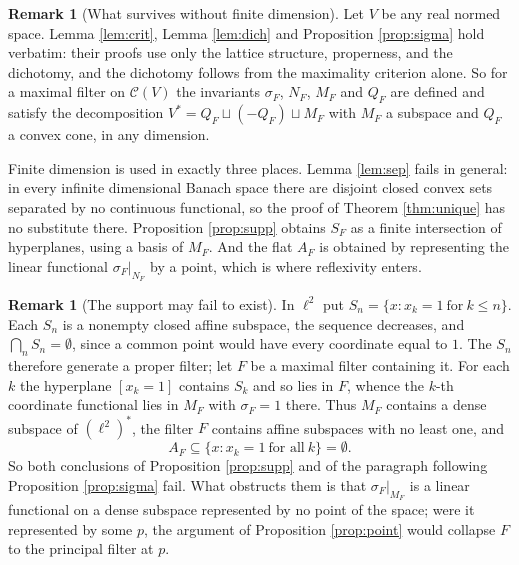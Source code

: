 \documentclass[11pt]{amsart}
\theoremstyle{plain}
\theoremstyle{definition}
\newtheorem{remark}[theorem]{Remark}
\newcommand{\CC}{\mathscr{C}}
\newcommand{\Vs}{V^{*}}
\begin{document}
\begin{remark}[What survives without finite dimension]\label{rem:generality}
Let $V$ be any real normed space. Lemma \ref{lem:crit}, Lemma \ref{lem:dich} and Proposition \ref{prop:sigma} hold verbatim: their proofs use only the lattice structure, properness, and the dichotomy, and the dichotomy follows from the maximality criterion alone. So for a maximal filter on $\CC(V)$ the invariants $\sigma_F$, $N_F$, $M_F$ and $Q_F$ are defined and satisfy the decomposition $\Vs=Q_F\sqcup(-Q_F)\sqcup M_F$ with $M_F$ a subspace and $Q_F$ a convex cone, in any dimension.

Finite dimension is used in exactly three places. Lemma \ref{lem:sep} fails in general: in every infinite dimensional Banach space there are disjoint closed convex sets separated by no continuous functional, so the proof of Theorem \ref{thm:unique} has no substitute there. Proposition \ref{prop:supp} obtains $S_F$ as a finite intersection of hyperplanes, using a basis of $M_F$. And the flat $A_F$ is obtained by representing the linear functional $\sigma_F|_{N_F}$ by a point, which is where reflexivity enters.
\end{remark}

\begin{remark}[The support may fail to exist]\label{rem:nosupport}
In $\ell^2$ put $S_n=\{x:x_k=1\ \text{for}\ k\le n\}$. Each $S_n$ is a nonempty closed affine subspace, the sequence decreases, and $\bigcap_nS_n=\emptyset$, since a common point would have every coordinate equal to $1$. The $S_n$ therefore generate a proper filter; let $F$ be a maximal filter containing it. For each $k$ the hyperplane $[x_k=1]$ contains $S_k$ and so lies in $F$, whence the $k$-th coordinate functional lies in $M_F$ with $\sigma_F=1$ there. Thus $M_F$ contains a dense subspace of $(\ell^2)^{*}$, the filter $F$ contains affine subspaces with no least one, and
\[
A_F\subseteq\{x:x_k=1\ \text{for all}\ k\}=\emptyset .
\]
So both conclusions of Proposition \ref{prop:supp} and of the paragraph following Proposition \ref{prop:sigma} fail. What obstructs them is that $\sigma_F|_{M_F}$ is a linear functional on a dense subspace represented by no point of the space; were it represented by some $p$, the argument of Proposition \ref{prop:point} would collapse $F$ to the principal filter at $p$.
\end{remark}
\end{document}
